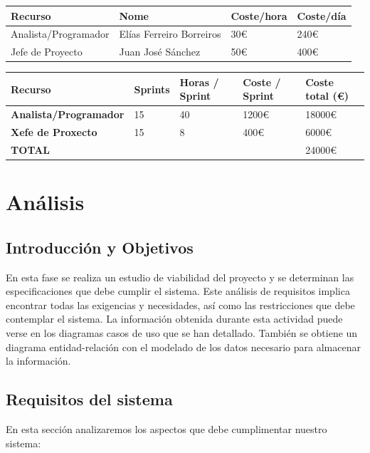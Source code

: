 \documentclass[12pt, a4paper, twoside]{book}
\begin{document}
	
	\begin{tabular}{| p{5cm} | p{3cm} | p{3cm} | p{3cm} |}
	\hline
	\textbf{Recurso} & \textbf{Nome} & \textbf{Coste/hora} & \textbf{Coste/día}
	\\ \hline
	{Analista/Programador} & {Elías Ferreiro Borreiros} & {30\euro} & {240\euro}
	\\ \hline
	{Jefe de Proyecto} & {Juan José Sánchez} & {50\euro} & {400\euro}
	\\ \hline
		
	\end{tabular}		
	
	
	\begin{tabular}{|p{5cm} | p{2cm} | p{2cm} | p{2cm} | p{2cm} |}
		
		\hline
		\textbf{Recurso} & \textbf{Sprints} & \textbf{Horas / Sprint} & \textbf{Coste / Sprint} & \textbf{Coste total (\euro)}
		\\ \hline
		\textbf{Analista/Programador} & 15 & 40 & 1200\euro  & 18000\euro
		\\ \hline
		\textbf{Xefe de Proxecto} & 15 & 8 & 400\euro & 6000\euro		
		\\ \hline
		\textbf{TOTAL} & & & & 24000\euro
		\\ \hline
	\end{tabular}
	

	\chapter{Análisis}
	\section{Introducción y Objetivos}
	En esta fase se realiza un estudio de viabilidad del proyecto y se determinan las especificaciones que debe cumplir el sistema. Este análisis de requisitos implica encontrar todas las exigencias y necesidades, así como las restricciones que debe contemplar el sistema. La información obtenida durante esta actividad puede verse en los diagramas casos de uso que se han detallado. También se obtiene un diagrama entidad-relación con el modelado de los datos necesario para almacenar la información.
	\section{Requisitos del sistema}
	En esta sección analizaremos los aspectos que debe cumplimentar nuestro sistema:
	
\end{document}

